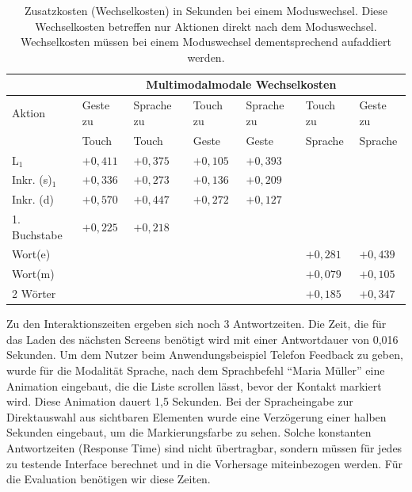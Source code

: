 \begin{table}[ht]
  \centering
		\begin{tabular}{|l|l|l|l|l|l|l|}
				\hline
				& \multicolumn{6}{|c|}{Multimodalmodale Wechselkosten}\\
				\hline
				Aktion 					& Geste zu		& Sprache zu 	& Touch zu		& Sprache zu		& Touch zu		& Geste zu\\
												& Touch 			& Touch 			& Geste 			& Geste					& Sprache 		& Sprache \\
				\hline
				L$_1$ 					& ${+0,411}$ 	&	${+0,375}$	& ${+0,105}$ 	&	${+0,393}$		& \multicolumn{2}{|c|}{}	\\
				\hline
				Inkr. (s)$_1$		& ${+0,336}$ 	&	${+0,273}$ 	& ${+0,136}$ 	&	${+0,209}$		& \multicolumn{2}{|c|}{}	\\
				\hline
				Inkr. (d) 					& ${+0,570}$ 	&	${+0,447}$ 	& ${+0,272}$ 	&	${+0,127}$		& \multicolumn{2}{|c|}{}	\\		
				\hline
				1. Buchstabe		& ${+0,225}$ 	& ${+0,218}$ 	&	\multicolumn{2}{|c|}{}			& \multicolumn{2}{|c|}{}	\\
				\hline
				Wort(e) 	& \multicolumn{2}{|c|}{}	& \multicolumn{2}{|c|}{}				& ${+0,281}$ 		& ${+0,439}$\\			
				\hline
				Wort(m)	& \multicolumn{2}{|c|}{}	& \multicolumn{2}{|c|}{}				& ${+0,079}$ 		& ${+0,105}$\\	
				\hline					
				2 Wörter 				& \multicolumn{2}{|c|}{}	& \multicolumn{2}{|c|}{}				& ${+0,185}$ 		& ${+0,347}$\\	
				\hline	
			\end{tabular}
	\caption[Wechselkosten eines Moduswechsels]{Zusatzkosten (Wechselkosten) in Sekunden bei einem Moduswechsel. Diese Wechselkosten betreffen nur Aktionen direkt nach dem Moduswechsel. Wechselkosten müssen bei einem Moduswechsel dementsprechend aufaddiert werden.}
	\label{tab:Wechselkosten}
\end{table}

Zu den Interaktionszeiten ergeben sich noch 3 Antwortzeiten. 
Die Zeit, die für das Laden des nächsten Screens benötigt wird mit einer Antwortdauer von 0,016 Sekunden. 
Um dem Nutzer beim Anwendungsbeispiel Telefon Feedback zu geben, wurde für die Modalität Sprache, nach dem Sprachbefehl "`Maria Müller"' eine Animation eingebaut, die die Liste scrollen lässt, bevor der Kontakt markiert wird. 
Diese Animation dauert 1,5 Sekunden. 
Bei der Spracheingabe zur Direktauswahl aus sichtbaren Elementen wurde eine Verzögerung einer halben Sekunden eingebaut, um die Markierungsfarbe zu sehen. 
Solche konstanten Antwortzeiten (Response Time) sind nicht übertragbar, sondern müssen für jedes zu testende Interface berechnet und in die Vorhersage miteinbezogen werden. Für die Evaluation benötigen wir diese Zeiten.

